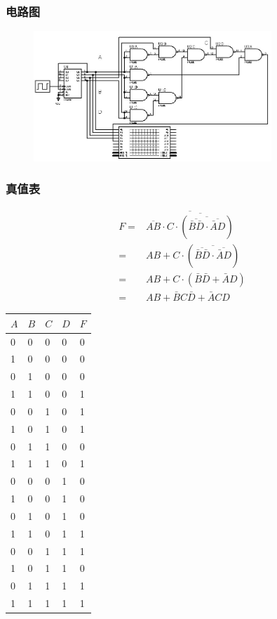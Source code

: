 \documentclass[UTF8, a4paper, 11pt]{article}
\begin{document}
\subsubsection{电路图}
\begin{figure}[H]
    \centering
    \includegraphics[width=0.8\textwidth]{ex2.2电路图.jpg}
\end{figure}
\subsubsection{真值表}
$$\begin{aligned}
F=&\overline{\overline{AB}\cdot\overline{C\cdot(\overline{\overline{\bar B\bar D}\cdot\overline{\bar AD}})}}\\
=&AB+C\cdot(\overline{\overline{\bar B\bar D}\cdot\overline{\bar AD}})\\
=&AB+C\cdot(\bar B\bar D+\bar AD)\\
=&AB+\bar BC\bar D+\bar ACD
\end{aligned}$$
\begin{table}[H]
\center
\begin{tabular}{|l|l|l|l|l|}
\hline
$A$ & $B$ & $C$ & $D$ & $F$ \\ \hline
0   & 0   & 0   & 0   & 0   \\ \hline
1   & 0   & 0   & 0   & 0   \\ \hline
0   & 1   & 0   & 0   & 0   \\ \hline
1   & 1   & 0   & 0   & 1   \\ \hline
0   & 0   & 1   & 0   & 1   \\ \hline
1   & 0   & 1   & 0   & 1   \\ \hline
0   & 1   & 1   & 0   & 0   \\ \hline
1   & 1   & 1   & 0   & 1   \\ \hline
0   & 0   & 0   & 1   & 0   \\ \hline
1   & 0   & 0   & 1   & 0   \\ \hline
0   & 1   & 0   & 1   & 0   \\ \hline
1   & 1   & 0   & 1   & 1   \\ \hline
0   & 0   & 1   & 1   & 1   \\ \hline
1   & 0   & 1   & 1   & 0   \\ \hline
0   & 1   & 1   & 1   & 1   \\ \hline
1   & 1   & 1   & 1   & 1   \\ \hline  
\end{tabular}
\end{table}
\end{document}
